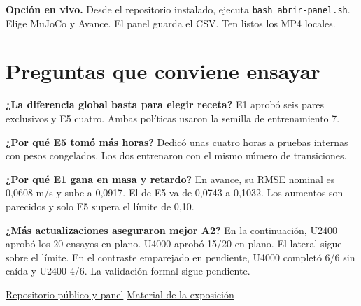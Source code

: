 \documentclass[10pt]{article}
\begin{document}
\textbf{Opción en vivo.} Desde el repositorio instalado, ejecuta \texttt{bash abrir-panel.sh}. Elige MuJoCo y Avance. El panel guarda el CSV. Ten listos los MP4 locales.

\section*{Preguntas que conviene ensayar}
\textbf{¿La diferencia global basta para elegir receta?} E1 aprobó seis pares exclusivos y E5 cuatro. Ambas políticas usaron la semilla de entrenamiento 7.

\textbf{¿Por qué E5 tomó más horas?} Dedicó unas cuatro horas a pruebas internas con pesos congelados. Los dos entrenaron con el mismo número de transiciones.

\textbf{¿Por qué E1 gana en masa y retardo?} En avance, su RMSE nominal es 0,0608 m/s y sube a 0,0917. El de E5 va de 0,0743 a 0,1032. Los aumentos son parecidos y solo E5 supera el límite de 0,10.

\textbf{¿Más actualizaciones aseguraron mejor A2?} En la continuación, U2400 aprobó los 20 ensayos en plano. U4000 aprobó 15/20 en plano. El lateral sigue sobre el límite. En el contraste emparejado en pendiente, U4000 completó 6/6 sin caída y U2400 4/6. La validación formal sigue pendiente.

\href{\repo}{Repositorio público y panel}\quad
\href{https://drive.google.com/drive/folders/1S8uEebuWrVEXju7h-1b8J_P_9BeeqBDS}{Material de la exposición}
\end{document}
